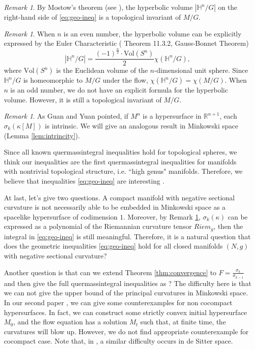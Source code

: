 \documentclass[reqno]{amsart}
\theoremstyle{remark}
\newtheorem{remark}[theorem]{Remark}
\newcommand{\abs}[1]{\left\lvert{#1}\right\rvert}
\renewcommand{\H}{{\mathbb{H}}}
\theoremstyle{definition}
\numberwithin{equation}{section}
\begin{document}
\begin{remark}
    By Mostow's theorem (see \cite{Benedetti1992}), the hyperbolic volume \(\abs{\H^n / G}\) on the right-hand side of \eqref{eq:geo-ineq} is a topological invariant of \( M/G \).
\end{remark}
\begin{remark}
    When \(n\) is an even number, the hyperbolic volume can be explicitly expressed by the Euler Characteristic (\cite{Ratcliffe2019} Theorem 11.3.2, Gauss-Bonnet Theorem)
    \[ |\H^n / G| = \frac{(-1)^{\frac{n}{2}} \cdot \text{Vol}(S^{n})}{2} \chi(\H^n / G), \]
    where \(\text{Vol}(S^{n})\) is the Euclidean volume of the $n$-dimensional unit sphere. Since \(\H^n / G\) is homeomorphic to \(M / G\) under the flow, \(\chi(\H^n / G) = \chi(M / G)\).
When \(n\) is an odd number, we do not have an explicit formula for the hyperbolic volume. However, it is still a topological invariant of \(M / G\). 
\end{remark}

\begin{remark}\label{GuanYuan}
    As Guan and Yuan \cite{guan2025-intrinsicality} pointed, if \(M^n\) is a hypersurface in  \(\mathbb{R}^{n+1}\), each \(\sigma_k(\kappa[M])\) is intrinsic. We will give an analogous result in Minkowski space (Lemma \ref{lem:intrincity}). 
\end{remark}

Since all known quermassintegral inequalities hold for topological spheres, we think our inequalities are the first quermassintegral inequalities for manifolds with nontrivial topological structure, i.e. ``high genus" manifolds.  Therefore, we believe that inequalities \eqref{eq:geo-ineq}  are  interesting .          

At last, let's give two questions. 
A compact manifold with negative sectional curvature is not necessarily able to be embedded in Minkowski space as a spacelike hypersurface of codimension \(1\). Moreover, by Remark \ref{GuanYuan}, \(\sigma_k(\kappa)\) can be expressed as a polynomial of the Riemannian curvature tensor \(Riem_g\), then the integral in \eqref{eq:geo-ineq} is still meaningful.
Therefore, it is a natural question that 
does the geometric inequalities \eqref{eq:geo-ineq} hold for all closed manifolds \((N,g)\) with negative sectional curvature? 

Another question is that can we extend Theorem \ref{thm:convergence} to $F=\frac{\sigma_k}{\sigma_{k-1}}$ and then give the full quermassintegral inequalities as \cite{Guan2009} ? The difficulty here is that we can not give the upper bound of the principal curvatures in Minkowski space. In our second paper \cite{LiWYin}, we can give some counterexamples for non cocompact hypersurfaces. In fact, we can construct some strictly convex initial hypersurface $M_0$, and the flow equation has a solution $M_t$ such that, at finite time, the curvatures will blow up. However, we do not find appropriate counterexample for cocompact case. Note that, in \cite{HuLi},  a similar difficulty occurs in de Sitter space. 
\end{document}
